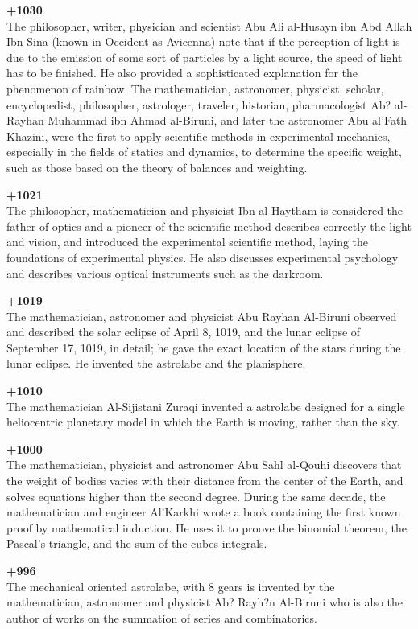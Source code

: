 \textbf{+1030}\\
The philosopher, writer, physician and scientist Abu Ali al-Husayn ibn Abd Allah Ibn Sina (known in Occident as Avicenna) note that if the perception of light is due to the emission of some sort of particles by a light source, the speed of light has to be finished. He also provided a sophisticated explanation for the phenomenon of rainbow. The mathematician, astronomer, physicist, scholar, encyclopedist, philosopher, astrologer, traveler, historian, pharmacologist Ab? al-Rayhan Muhammad ibn Ahmad al-Biruni, and later the astronomer Abu al'Fath Khazini, were the first to apply scientific methods in experimental mechanics, especially in the fields of statics and dynamics, to determine the specific weight, such as those based on the theory of balances and weighting.

\textbf{+1021}\\
The philosopher, mathematician and physicist Ibn al-Haytham is considered the father of optics and a pioneer of the scientific method describes correctly the light and vision, and introduced the experimental scientific method, laying the foundations of experimental physics. He also discusses experimental psychology and describes various optical instruments such as the darkroom.

\textbf{+1019}\\
The mathematician, astronomer and physicist Abu Rayhan Al-Biruni observed and described the solar eclipse of April 8, 1019, and the lunar eclipse of September 17, 1019, in detail; he gave the exact location of the stars during the lunar eclipse. He invented the astrolabe and the planisphere.

\textbf{+1010}\\
The mathematician Al-Sijistani Zuraqi invented a astrolabe designed for a single heliocentric planetary model in which the Earth is moving, rather than the sky.

\textbf{+1000}\\
The mathematician, physicist and astronomer Abu Sahl al-Qouhi discovers that the weight of bodies varies with their distance from the center of the Earth, and solves equations higher than the second degree. During the same decade, the mathematician and engineer Al'Karkhi wrote a book containing the first known proof by mathematical induction. He uses it to proove the binomial theorem, the Pascal's triangle, and the sum of the cubes integrals.

\textbf{+996}\\
The mechanical oriented astrolabe, with 8 gears is invented by the mathematician, astronomer and physicist Ab? Rayh?n Al-Biruni who is also the author of works on the summation of series and combinatorics.

